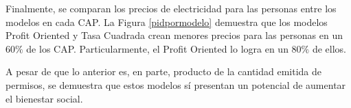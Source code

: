 Finalmente, se comparan los precios de electricidad para las personas entre los modelos en cada CAP. La Figura \ref{pidpormodelo} demuestra que los modelos Profit Oriented y Tasa Cuadrada crean menores precios para las personas en un $60\%$ de los CAP. Particularmente, el Profit Oriented lo logra en un $80\%$ de ellos. 
\vspace{2.5mm}

A pesar de que lo anterior es, en parte, producto de la cantidad emitida de permisos, se demuestra que estos modelos sí presentan un potencial de aumentar el bienestar social.

